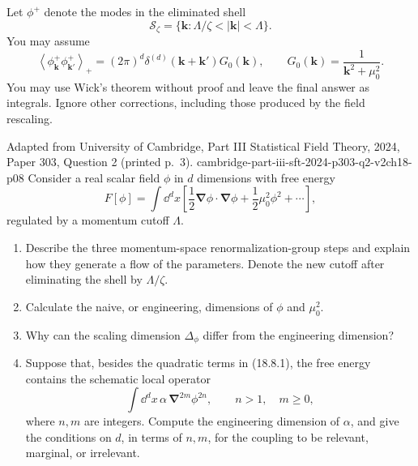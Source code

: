 \begin{enumerate}
\begin{enumerate}
\begin{enumerate}
      Let \(\phi^+\) denote the modes in the eliminated shell
      \[
        \mathcal S_\zeta
          =\{\mathbf k:\Lambda/\zeta<|\mathbf k|<\Lambda\}.
      \]
      You may assume
      \[
        \left\langle
          \phi_{\mathbf k}^+\phi_{\mathbf k'}^+
        \right\rangle_+
        =(2\pi)^d\delta^{(d)}(\mathbf k+\mathbf k')G_0(\mathbf k),
        \qquad
        G_0(\mathbf k)=\frac{1}{\mathbf k^2+\mu_0^2}.
        \tag{18.7.4}
      \]
      You may use Wick's theorem without proof and leave the final answer
      as integrals.  Ignore other corrections, including those produced
      by the field rescaling.
    \end{enumerate}
  \end{enumerate}

  {Adapted from University of Cambridge, Part III Statistical Field Theory,
  2024, Paper 303, Question 2 (printed p.~3).}
  {cambridge-part-iii-sft-2024-p303-q2-v2ch18-p08}
  Consider a real scalar field \(\phi\) in \(d\) dimensions with free
  energy
  \[
    F[\phi]=\int \dd^dx\left[
      \frac12\boldsymbol\nabla\phi\mathbin{\cdot}\boldsymbol\nabla\phi
      +\frac12\mu_0^2\phi^2+\cdots\right],
    \tag{18.8.1}
  \]
  regulated by a momentum cutoff \(\Lambda\).
  \begin{enumerate}
    \item[(a)]
    Describe the three momentum-space renormalization-group steps and
    explain how they generate a flow of the parameters.  Denote the new
    cutoff after eliminating the shell by \(\Lambda/\zeta\).

    \item[(b)]
    Calculate the naive, or engineering, dimensions of \(\phi\) and
    \(\mu_0^2\).

    \item[(c)]
    Why can the scaling dimension \(\Delta_\phi\) differ from the
    engineering dimension?

    \item[(d)]
    Suppose that, besides the quadratic terms in (18.8.1), the free energy
    contains the schematic local operator
    \[
      \int \dd^dx\,\alpha\,\boldsymbol\nabla^{2m}\phi^{2n},
      \qquad n>1,\quad m\geq0,
      \tag{18.8.2}
    \]
    where \(n,m\) are integers.  Compute the engineering dimension of
    \(\alpha\), and give the conditions on \(d\), in terms of \(n,m\),
    for the coupling to be relevant, marginal, or irrelevant.


\end{enumerate}
\end{enumerate}
